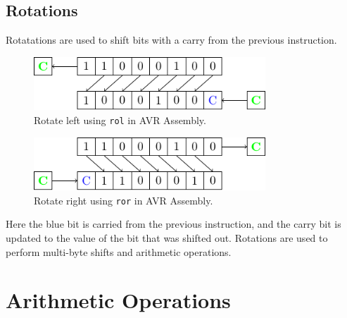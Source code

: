 \documentclass[a4paper]{report}
\begin{document}
\subsection{Rotations}
Rotatations are used to shift bits with a carry from the previous instruction.
\begin{figure}[H]
    \centering
    \includegraphics[height = 2cm, keepaspectratio = true]{figures/rotate_left.pdf}
    \caption{Rotate left using \texttt{rol} in AVR Assembly.} %
\end{figure}
\begin{figure}[H]
    \centering
    \includegraphics[height = 2cm, keepaspectratio = true]{figures/rotate_right.pdf}
    \caption{Rotate right using \texttt{ror} in AVR Assembly.} %
\end{figure}
Here the blue bit is carried from the previous instruction, and the carry bit is updated
to the value of the bit that was shifted out.
Rotations are used to perform multi-byte shifts and arithmetic operations.
\section{Arithmetic Operations}
\end{document}
